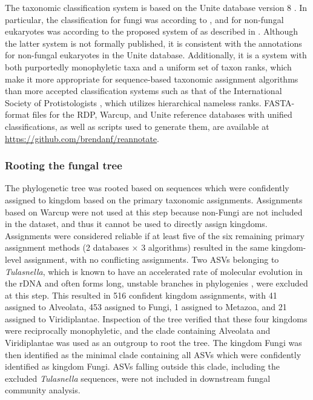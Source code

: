 \documentclass[
]{article}
\begin{document}
The taxonomic classification system is based on the Unite database version 8 \autocite{nilsson2019a}.
In particular, the classification for fungi was according to \textcite{tedersoo2018}, and for non-fungal eukaryotes was according to the proposed system of \textcite{tedersoo2017c} as described in \autocite{tedersoodata2017}.
Although the latter system is not formally published, it is consistent with the annotations for non-fungal eukaryotes in the Unite database.
Additionally, it is a system with both purportedly monophyletic taxa and a uniform set of taxon ranks, which make it more appropriate for sequence-based taxonomic assignment algorithms than more accepted classification systems such as that of the International Society of Protistologists \autocite{adl2019}, which utilizes hierarchical nameless ranks.
FASTA-format files for the RDP, Warcup, and Unite reference databases with unified classifications, as well as scripts used to generate them, are available at \url{https://github.com/brendanf/reannotate}.

\hypertarget{rooting-the-fungal-tree}{%
\subsubsection{Rooting the fungal tree}\label{rooting-the-fungal-tree}}

The phylogenetic tree was rooted based on sequences which were confidently assigned to kingdom based on the primary taxonomic assignments.
Assignments based on Warcup were not used at this step because non-Fungi are not included in the dataset, and thus it cannot be used to directly assign kingdoms.
Assignments were considered reliable if at least five of the six remaining primary assignment methods (2 databases × 3 algorithms) resulted in the same kingdom-level assignment, with no conflicting assignments.
Two ASVs belonging to \emph{Tulasnella}, which is known to have an accelerated rate of molecular evolution in the rDNA and often forms long, unstable branches in phylogenies \autocite{moncalvo2006}, were excluded at this step.
This resulted in 516 confident kingdom assignments, with 41 assigned to Alveolata, 453 assigned to Fungi, 1 assigned to Metazoa, and 21 assigned to Viridiplantae.
Inspection of the tree verified that these four kingdoms were reciprocally monophyletic, and the clade containing Alveolata and Viridiplantae was used as an outgroup to root the tree.
The kingdom Fungi was then identified as the minimal clade containing all ASVs which were confidently identified as kingdom Fungi.
ASVs falling outside this clade, including the excluded \emph{Tulasnella} sequences, were not included in downstream fungal community analysis.
\end{document}
